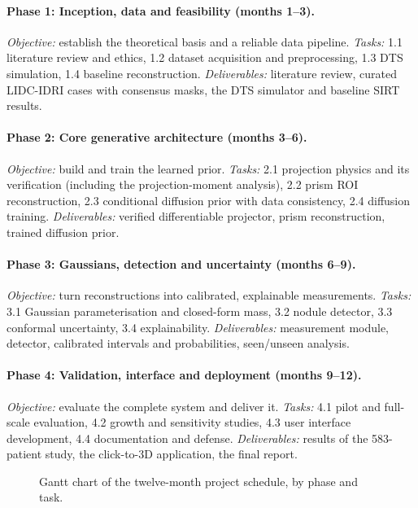 \paragraph{Phase 1: Inception, data and feasibility (months 1--3).} \emph{Objective:} establish the theoretical basis and a reliable data pipeline. \emph{Tasks:} 1.1 literature review and ethics, 1.2 dataset acquisition and preprocessing, 1.3 DTS simulation, 1.4 baseline reconstruction. \emph{Deliverables:} literature review, curated LIDC-IDRI cases with consensus masks, the DTS simulator and baseline SIRT results.

\paragraph{Phase 2: Core generative architecture (months 3--6).} \emph{Objective:} build and train the learned prior. \emph{Tasks:} 2.1 projection physics and its verification (including the projection-moment analysis), 2.2 prism ROI reconstruction, 2.3 conditional diffusion prior with data consistency, 2.4 diffusion training. \emph{Deliverables:} verified differentiable projector, prism reconstruction, trained diffusion prior.

\paragraph{Phase 3: Gaussians, detection and uncertainty (months 6--9).} \emph{Objective:} turn reconstructions into calibrated, explainable measurements. \emph{Tasks:} 3.1 Gaussian parameterisation and closed-form mass, 3.2 nodule detector, 3.3 conformal uncertainty, 3.4 explainability. \emph{Deliverables:} measurement module, detector, calibrated intervals and probabilities, seen/unseen analysis.

\paragraph{Phase 4: Validation, interface and deployment (months 9--12).} \emph{Objective:} evaluate the complete system and deliver it. \emph{Tasks:} 4.1 pilot and full-scale evaluation, 4.2 growth and sensitivity studies, 4.3 user interface development, 4.4 documentation and defense. \emph{Deliverables:} results of the 583-patient study, the click-to-3D application, the final report.

\begin{figure}
  \centering
  \resizebox{0.95\textheight}{!}{}
  \caption{Gantt chart of the twelve-month project schedule, by phase and task.}
  \label{fig:gantt}
\end{figure}

